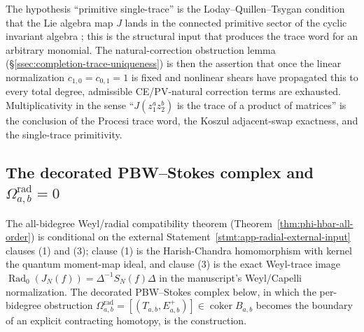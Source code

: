 \begin{rmk}
\label{rmk:completion-multiplicativity-forced}
The hypothesis ``primitive single-trace'' is the
Loday--Quillen--Tsygan condition that the Lie algebra map \(J\) lands
in the connected primitive sector of the cyclic invariant algebra
\cite{loday-quillen}\cite{tsygan}; this is the structural
input that produces the trace word for an arbitrary monomial.  The
natural-correction obstruction lemma
(\S\ref{ssec:completion-trace-uniqueness}) is then the assertion that
once the linear normalization \(c_{1,0}=c_{0,1}=1\) is fixed and
nonlinear shears have propagated this to every total degree, admissible
CE/PV-natural correction terms are exhausted.  Multiplicativity
in the sense ``\(J(z_1^az_2^b)\) is the trace of a product of
matrices'' is the conclusion of the
Procesi trace word, the Koszul adjacent-swap exactness, and the
single-trace primitivity.
\end{rmk}

\subsection{\texorpdfstring{The decorated PBW--Stokes complex and \(\Omega^{\mathrm{rad}}_{a,b}=0\)}{The decorated PBW-Stokes complex and Omega-rad-a,b = 0}}
\label{ssec:completion-decorated-pbw-stokes}

The all-bidegree Weyl/radial compatibility theorem
(Theorem~\ref{thm:phi-hbar-all-order}) is conditional on the
external Statement~\ref{stmt:app-radial-external-input} clauses (1)
and (3); clause (1) is the Harish-Chandra homomorphism with kernel
the quantum moment-map ideal, and clause (3) is the exact Weyl-trace
image \(\operatorname{Rad}_0(J_N(f))=\Delta^{-1}S_N(f)\Delta\) in the
manuscript's Weyl/Capelli normalization.  The decorated PBW--Stokes
complex below, in which the per-bidegree obstruction
\(\Omega^{\mathrm{rad}}_{a,b}=[(T_{a,b},E^+_{a,b})]\in
\operatorname{coker}B_{a,b}\) becomes the boundary of an explicit
contracting homotopy, is the construction.

